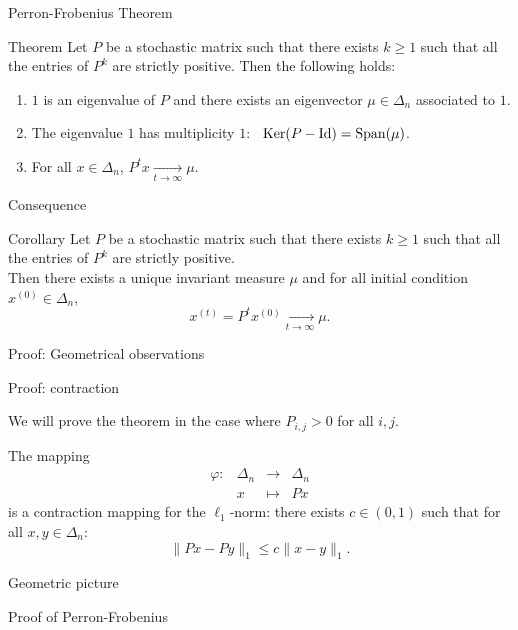 \documentclass{beamer}
\begin{document}
\begin{frame}[t]{Perron-Frobenius Theorem}
	\grid
	\begin{block}{Theorem}
		Let $P$ be a stochastic matrix such that there exists $k \geq 1$ such that all the entries of $P^k$ are strictly positive. Then the following holds:
		\begin{enumerate}
			\vspace{0.3cm}
		\item $1$ is an eigenvalue of $P$ and there exists an eigenvector $\mu \in \Delta_n$ associated to $1$.
			\vspace{0.3cm}
		\item The eigenvalue $1$ has multiplicity $1$: \ ${{\rm Ker}}(P-{{\rm Id}}) = {{\rm Span}}(\mu)$.
			\vspace{0.3cm}
		\item For all $x \in \Delta_n$, $P^t x \xrightarrow[t \to \infty]{} \mu$.
	\end{enumerate}
\end{block}
\end{frame}


\begin{frame}[t]{Consequence}
	\grid
	\begin{block}{Corollary}
		Let $P$ be a stochastic matrix such that there exists $k \geq 1$ such that all the entries of $P^k$ are strictly positive. 
		\\

		Then there exists a unique invariant measure $\mu$ and for all initial condition $x^{(0)} \in \Delta_n$,
		$$
		x^{(t)} = P^t x^{(0)} \xrightarrow[t \to \infty]{} \mu.
		$$
	\end{block}
\end{frame}

\begin{frame}[t]{Proof: Geometrical observations}
	\grid

\end{frame}

\begin{frame}[t]{Proof: contraction}
	\grid

	\vspace{-0.3cm}
	We will prove the theorem in the case where $P_{i,j} > 0$ for all $i,j$.
	\vspace{-0.3cm}
	\begin{lemma}\label{lem:contract}
		The mapping 
		$$
		\begin{array}{cccc}
			\varphi:& \Delta_n &\to& \Delta_n \\
					& x & \mapsto & Px
		\end{array}
		$$
		is a contraction mapping for the $\ell_1$-norm: there exists $c \in (0,1)$ such that for all $x,y \in \Delta_n$:
		$$
		\| Px - Py \|_1 \leq c \| x-y\|_1.
		$$
	\end{lemma}

\end{frame}
\begin{frame}[t]{Geometric picture}
	\grid
\end{frame}
\begin{frame}[t]{Proof of Perron-Frobenius}
	\grid
	\pause
\end{frame}
\end{document}
